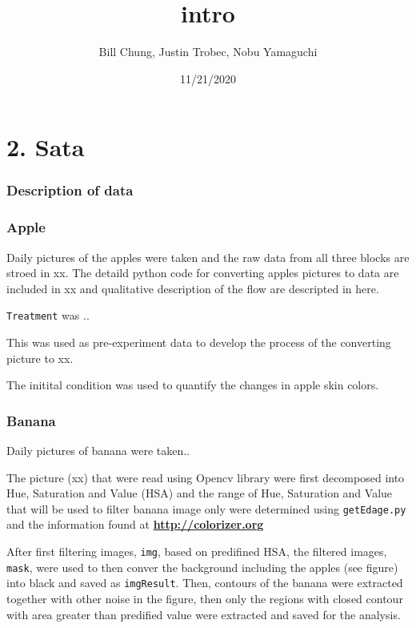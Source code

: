 \documentclass[
]{article}
\title{intro}
\author{Bill Chung, Justin Trobec, Nobu Yamaguchi}
\date{11/21/2020}
\begin{document}
\maketitle

\hypertarget{sata}{%
\section{2. Sata}\label{sata}}

\hypertarget{description-of-data}{%
\subsubsection{Description of data}\label{description-of-data}}

\hypertarget{apple}{%
\subsubsection{Apple}\label{apple}}

Daily pictures of the apples were taken and the raw data from all three
blocks are stroed in xx. The detaild python code for converting apples
pictures to data are included in xx and qualitative description of the
flow are descripted in here.

\texttt{Treatment} was ..

This was used as pre-experiment data to develop the process of the
converting picture to xx.

The initital condition was used to quantify the changes in apple skin
colors.

\hypertarget{banana}{%
\subsubsection{Banana}\label{banana}}

Daily pictures of banana were taken..

The picture (xx) that were read using Opencv library were first
decomposed into Hue, Saturation and Value (HSA) and the range of Hue,
Saturation and Value that will be used to filter banana image only were
determined using \texttt{getEdage.py} and the information found at
\textbf{\url{http://colorizer.org}}

After first filtering images, \texttt{img}, based on predifined HSA, the
filtered images, \texttt{mask}, were used to then conver the background
including the apples (see figure) into black and saved as
\texttt{imgResult}. Then, contours of the banana were extracted together
with other noise in the figure, then only the regions with closed
contour with area greater than predified value were extracted and saved
for the analysis.
\end{document}
